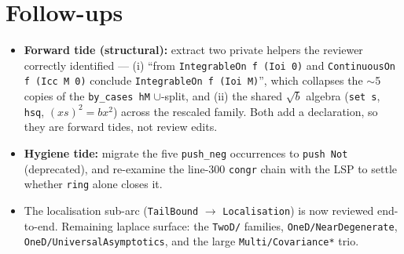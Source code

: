 \documentclass[11pt]{article}
\begin{document}
\section{Follow-ups}
\begin{itemize}[noitemsep]
  \item \textbf{Forward tide (structural):} extract two private helpers the reviewer correctly
    identified --- (i) ``from \texttt{IntegrableOn f (Ioi 0)} and \texttt{ContinuousOn f (Icc M 0)}
    conclude \texttt{IntegrableOn f (Ioi M)}'', which collapses the $\sim$5 copies of the
    \texttt{by\_cases hM} $\cup$-split, and (ii) the shared $\sqrt b$ algebra
    (\texttt{set s}, \texttt{hsq}, $(xs)^2=bx^2$) across the rescaled family. Both add a declaration,
    so they are forward tides, not review edits.
  \item \textbf{Hygiene tide:} migrate the five \texttt{push\_neg} occurrences to \texttt{push Not}
    (deprecated), and re-examine the line-300 \texttt{congr} chain with the LSP to settle whether
    \texttt{ring} alone closes it.
  \item The localisation sub-arc (\texttt{TailBound} $\to$ \texttt{Localisation}) is now reviewed
    end-to-end. Remaining laplace surface: the \texttt{TwoD/} families, \texttt{OneD/NearDegenerate},
    \texttt{OneD/UniversalAsymptotics}, and the large \texttt{Multi/Covariance*} trio.
\end{itemize}
\end{document}
